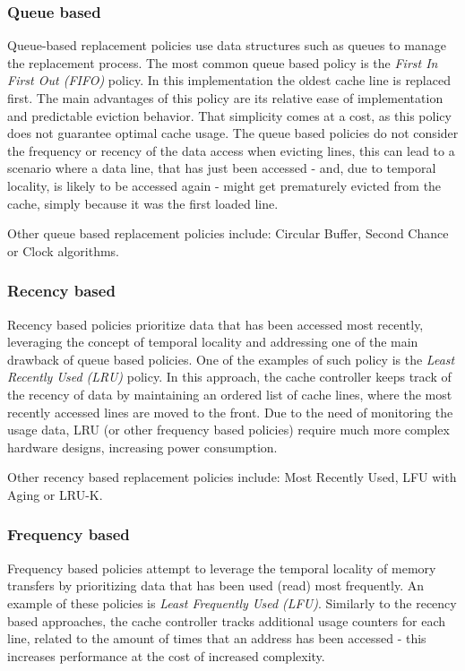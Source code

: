 \subsubsection{Queue based}
Queue-based replacement policies use data structures such as queues to manage the replacement process. The most common queue based policy is the
\textit{First In First Out (FIFO)} policy. In this implementation the oldest cache line is replaced first. The main advantages of this policy are  %
its relative ease of implementation and predictable eviction behavior. That simplicity comes at a cost, as this policy does not guarantee optimal cache usage. The queue
based policies do not consider the frequency or recency of the data access when evicting lines, this can lead to a scenario where a data line, that has just been accessed - and, due to
temporal locality, is likely to be accessed again - might get prematurely evicted from the cache, simply because it was the first loaded line.

\vspace{10px}\noindent Other queue based replacement policies include: Circular Buffer, Second Chance or Clock algorithms. %

\subsubsection{Recency based}
Recency based policies prioritize data that has been accessed most recently, leveraging the concept of temporal locality and addressing one of
the main drawback of queue based policies. One of the examples of such policy is the \textit{Least Recently Used (LRU)} policy. In this approach, the cache controller
keeps track of the recency of data by maintaining an ordered list of cache lines, where the most recently accessed lines are moved to the front. Due to the need of monitoring
the usage data, LRU (or other frequency based policies) require much more complex hardware designs, increasing power consumption. 

\vspace{10px}\noindent Other recency based replacement policies include: Most Recently Used, LFU with Aging or LRU-K. %

\subsubsection{Frequency based}
Frequency based policies attempt to leverage the temporal locality of memory transfers by prioritizing data that has been used (read) most frequently.
An example of these policies is \textit{Least Frequently Used (LFU)}. Similarly to the recency based approaches, the cache controller tracks additional usage counters
for each line, related to the amount of times that an address has been accessed - this increases performance at the cost of increased complexity.

